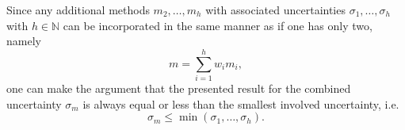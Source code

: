 \documentclass{report}
\numberwithin{tm}{section}
\begin{document}
Since any additional methods $m_2,\dots,m_h$ with associated uncertainties $\sigma_1,\dots,\sigma_h$ with $h \in \mathbb{N}$ can be incorporated in the same manner as if one has only two, namely \begin{equation}
	m = \sum_{i=1}^{h}w_im_i,
\end{equation} one can make the argument that the presented result for the combined uncertainty $\sigma_m$ is always equal or less than the smallest involved uncertainty, i.e. \begin{equation}
\sigma_m \leq \min(\sigma_1,\dots,\sigma_h).
\end{equation}
	


	
\end{document}

